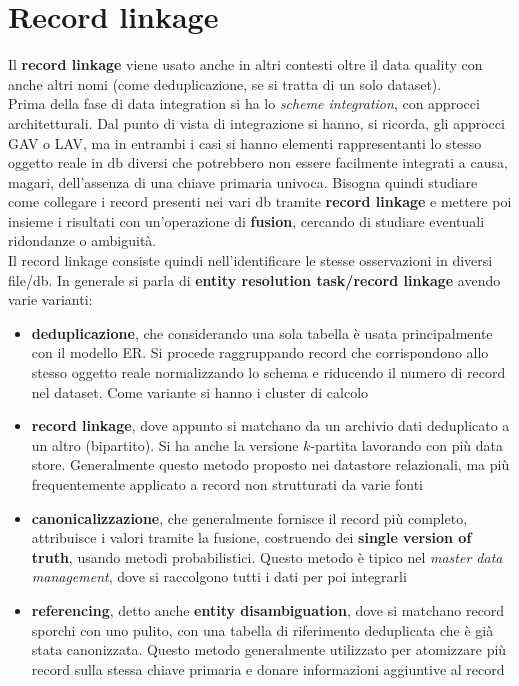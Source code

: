 \section{Record linkage}
Il \textbf{record linkage} viene usato anche in altri contesti oltre il data quality con anche altri nomi (come deduplicazione, se si tratta di un solo dataset). \\ 
Prima della fase di data integration si ha lo \textit{scheme integration}, con approcci architetturali. Dal punto di vista di integrazione si hanno, si ricorda, gli approcci GAV o LAV, ma in entrambi i casi si hanno elementi rappresentanti lo stesso oggetto reale in db diversi che potrebbero non essere facilmente  integrati a causa, magari, dell'assenza di una chiave primaria univoca. Bisogna quindi studiare come collegare i record presenti nei vari db tramite \textbf{record linkage} e mettere poi insieme i risultati con un'operazione di \textbf{fusion}, cercando di studiare eventuali ridondanze o ambiguità.\\ 

Il record linkage consiste quindi nell'identificare le stesse osservazioni in diversi file/db. In generale si parla di \textbf{entity resolution task/record linkage} avendo varie varianti:
\begin{itemize}
    \item \textbf{deduplicazione}, che considerando una sola tabella è usata principalmente con il modello ER. Si procede raggruppando record che corrispondono allo stesso oggetto reale normalizzando lo schema e riducendo il numero di record nel dataset. Come variante si hanno i cluster di calcolo
    \item \textbf{record linkage}, dove appunto si matchano da un archivio dati deduplicato a un altro (bipartito). Si ha anche la versione $k$-partita lavorando con più data store. Generalmente questo metodo proposto nei datastore relazionali, ma più frequentemente applicato a record non strutturati da varie fonti
    \item \textbf{canonicalizzazione}, che generalmente fornisce il record più completo, attribuisce i valori tramite la fusione, costruendo dei \textbf{single version of truth}, usando metodi probabilistici. Questo metodo è tipico nel \textit{master data management}, dove si raccolgono tutti i dati per poi integrarli
    \item \textbf{referencing}, detto anche \textbf{entity disambiguation}, dove si matchano record sporchi con uno pulito, con una tabella di riferimento deduplicata che è già stata canonizzata. Questo metodo generalmente utilizzato per atomizzare più record sulla stessa chiave primaria e donare informazioni aggiuntive al record
\end{itemize}

